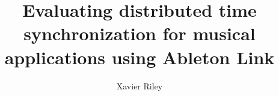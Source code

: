 \documentclass[11pt]{article} %
\title{Evaluating distributed time synchronization for musical applications using Ableton Link}
\author{Xavier Riley}
\theoremstyle{plain}
\theoremstyle{definition}
\begin{document}
\maketitle

\declaration








\end{document}
